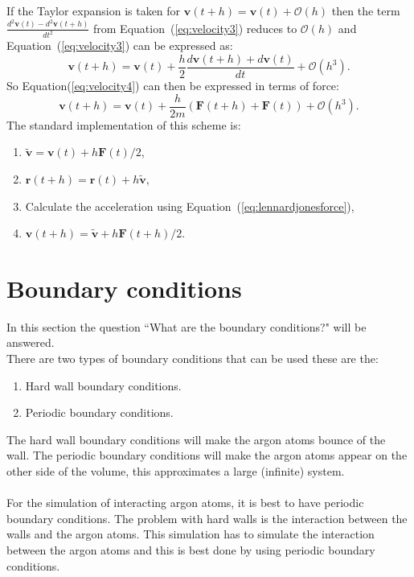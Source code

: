 \documentclass[12pt,a4paper]{report}
\begin{document}
If the Taylor expansion is taken for $\boldsymbol{v}(t+h)=\boldsymbol{v}(t)+\mathcal{O}(h)$ then the term $\frac{d^2\boldsymbol{v}(t)-d^2\boldsymbol{v}(t+h)}{dt^2}$ from Equation~(\ref{eq:velocity3}) reduces to $\mathcal{O}(h)$ and Equation~(\ref{eq:velocity3}) can be expressed as:
\begin{equation}\label{eq:velocity4}
\boldsymbol{v}(t+h)= \boldsymbol{v}(t) + \frac{h}{2}\frac{d\boldsymbol{v}(t+h)+d\boldsymbol{v}(t)}{dt} +\mathcal{O}(h^3)\text{.}
\end{equation}
So Equation(\ref{eq:velocity4}) can then be expressed in terms of force:
\begin{equation}\label{eq:velocityverlet}
\boldsymbol{v}(t+h)= \boldsymbol{v}(t) + \frac{h}{2m}(\boldsymbol{F}(t+h)+\boldsymbol{F}(t)) +\mathcal{O}(h^3)\text{.}
\end{equation}
The standard implementation of this scheme is:
\begin{enumerate}
 \item $\tilde{\boldsymbol{v}} = \boldsymbol{v}(t) + h\boldsymbol{F}(t)/2$,
 \item $\boldsymbol{r}(t+h)=\boldsymbol{r}(t)+h\tilde{\boldsymbol{v}}$,
 \item Calculate the acceleration using Equation~(\ref{eq:lennardjonesforce}),
 \item $\boldsymbol{v}(t+h)=\tilde{\boldsymbol{v}}+h\boldsymbol{F}(t+h)/2$.
\end{enumerate}
\section{Boundary conditions}
In this section the question ``What are the boundary conditions?" will be answered.\\
There are two types of boundary conditions that can be used these are the:
\begin{enumerate}
 \item Hard wall boundary conditions.
 \item Periodic boundary conditions.
\end{enumerate}
The hard wall boundary conditions will make the argon atoms bounce of the wall. The periodic boundary conditions will make the argon atoms appear on the other side of the volume, this approximates a large (infinite) system.\\ \\
For the simulation of interacting argon atoms, it is best to have periodic boundary conditions. The problem with hard walls is the interaction between the walls and the argon atoms. This simulation has to simulate the interaction between the argon atoms and this is best done by using periodic boundary conditions.
\end{document}
